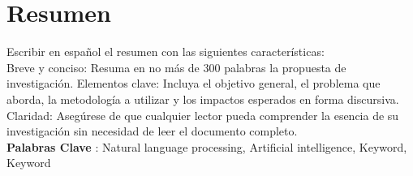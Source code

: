 \chapter*{Resumen}

\par Escribir en español el resumen con las siguientes características:\\
Breve y conciso: Resuma en no más de 300 palabras la propuesta de investigación.
Elementos clave: Incluya el objetivo general, el problema que aborda, la metodología a utilizar y los impactos esperados en forma discursiva.
Claridad: Asegúrese de que cualquier lector pueda comprender la esencia de su investigación sin necesidad de leer el documento completo. \\


{\large \textbf{Palabras Clave} : }Natural language processing, Artificial intelligence, Keyword, Keyword


